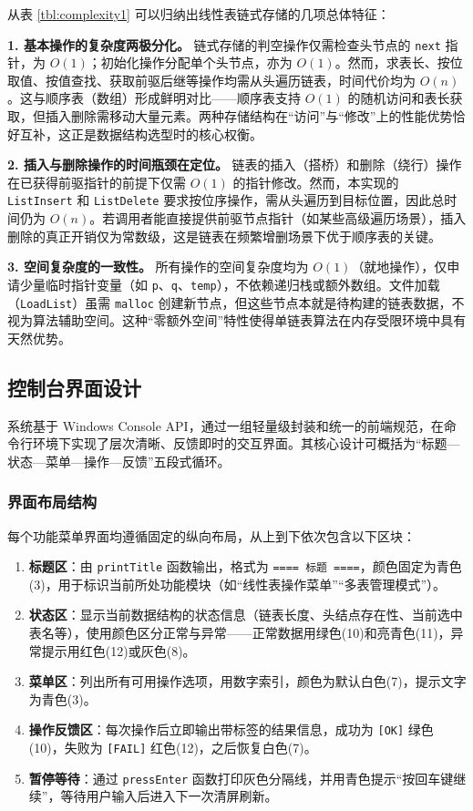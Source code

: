 \documentclass[supercite]{Experimental_Report}
\begin{document}
{\small
从表 \ref{tbl:complexity1} 可以归纳出线性表链式存储的几项总体特征：

\textbf{1. 基本操作的复杂度两极分化。}
链式存储的判空操作仅需检查头节点的 \texttt{next} 指针，为 $O(1)$；初始化操作分配单个头节点，亦为 $O(1)$。然而，求表长、按位取值、按值查找、获取前驱后继等操作均需从头遍历链表，时间代价均为 $O(n)$。这与顺序表（数组）形成鲜明对比——顺序表支持 $O(1)$ 的随机访问和表长获取，但插入删除需移动大量元素。两种存储结构在“访问”与“修改”上的性能优势恰好互补，这正是数据结构选型时的核心权衡。

\textbf{2. 插入与删除操作的时间瓶颈在定位。}
链表的插入（搭桥）和删除（绕行）操作在已获得前驱指针的前提下仅需 $O(1)$ 的指针修改。然而，本实现的 \texttt{ListInsert} 和 \texttt{ListDelete} 要求按位序操作，需从头遍历到目标位置，因此总时间仍为 $O(n)$。若调用者能直接提供前驱节点指针（如某些高级遍历场景），插入删除的真正开销仅为常数级，这是链表在频繁增删场景下优于顺序表的关键。



\textbf{3. 空间复杂度的一致性。}
所有操作的空间复杂度均为 $O(1)$（就地操作），仅申请少量临时指针变量（如 \texttt{p}、\texttt{q}、\texttt{temp}），不依赖递归栈或额外数组。文件加载（\texttt{LoadList}）虽需 \texttt{malloc} 创建新节点，但这些节点本就是待构建的链表数据，不视为算法辅助空间。这种“零额外空间”特性使得单链表算法在内存受限环境中具有天然优势。


\newpage
\subsection{控制台界面设计}

系统基于 Windows Console API，通过一组轻量级封装和统一的前端规范，在命令行环境下实现了层次清晰、反馈即时的交互界面。其核心设计可概括为“标题—状态—菜单—操作—反馈”五段式循环。

\subsubsection{界面布局结构}

每个功能菜单界面均遵循固定的纵向布局，从上到下依次包含以下区块：

\begin{enumerate}
    \item \textbf{标题区}：由 \texttt{printTitle} 函数输出，格式为 \texttt{==== 标题 ====}，颜色固定为青色(3)，用于标识当前所处功能模块（如“线性表操作菜单”“多表管理模式”）。
    \item \textbf{状态区}：显示当前数据结构的状态信息（链表长度、头结点存在性、当前选中表名等），使用颜色区分正常与异常——正常数据用绿色(10)和亮青色(11)，异常提示用红色(12)或灰色(8)。
    \item \textbf{菜单区}：列出所有可用操作选项，用数字索引，颜色为默认白色(7)，提示文字为青色(3)。
    \item \textbf{操作反馈区}：每次操作后立即输出带标签的结果信息，成功为 \texttt{[OK]} 绿色(10)，失败为 \texttt{[FAIL]} 红色(12)，之后恢复白色(7)。
    \item \textbf{暂停等待}：通过 \texttt{pressEnter} 函数打印灰色分隔线，并用青色提示“按回车键继续”，等待用户输入后进入下一次清屏刷新。
\end{enumerate}

}
\end{document}
